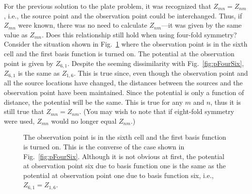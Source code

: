 For the previous solution to the plate problem, it was recognized that
$Z_{mn}=Z_{nm}$, i.e., the source point and the observation point
could be interchanged.  Thus, if $Z_{mn}$ were known, there was no
need to calculate $Z_{nm}$---it was given by the same value as
$Z_{mn}$.  Does this relationship still hold when using four-fold
symmetry?  Consider the situation shown in Fig.\ \ref{fig:zSixOne}
where the observation point is in the sixth cell and the first basis
function is turned on.  The potential at the observation point is
given by $Z_{6,1}$.  Despite the seeming dissimilarity with Fig.\
\ref{fig:pFourSix},  $Z_{6,1}$ is the same as $Z_{1,6}$.  This is true
since, even though the observation point and all the source locations have
changed, the distances between the sources and the observation point
have been maintained.  Since the potential is only a function of
distance, the potential will be the same.  This is true for any $m$
and $n$, thus it is still true that $Z_{mn}=Z_{nm}$.  (You may wish to
note that if eight-fold symmetry were used, $Z_{mn}$ would no longer
equal $Z_{nm}$.)
\begin{figure}
  \begin{center}
   \end{center}
  \caption{The observation point is in the sixth cell and the first
  basis function is turned on.  This is the converse of the case shown
  in Fig.\ \ref{fig:pFourSix}.  Although it is not obvious at first,
  the potential at observation point six due to basis function one is
  the same as the potential at observation point one due to basis
  function six, i.e., $Z_{6,1}=Z_{1,6}$.}
  \label{fig:zSixOne}
\end{figure}

